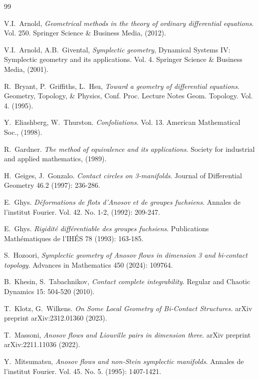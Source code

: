 \documentclass[10pt]{amsart}
\theoremstyle{definition}
\begin{document}
\begin{thebibliography}{99}


 V.I.~Arnold, \textit{Geometrical methods in the theory of ordinary differential equations}. Vol. 250. Springer Science \& Business Media, (2012).

 V.I.~Arnold, A.B.~Givental, {\em Symplectic geometry}, Dynamical Systems IV: Symplectic geometry and its applications. Vol. 4. Springer Science \& Business Media, (2001).


 R.~Bryant, P.~Griffiths, L.~Hsu, \textit{Toward a geometry of differential equations}. Geometry, Topology, \& Physics, Conf. Proc. Lecture Notes Geom. Topology. Vol. 4. (1995).



 Y.~Eliashberg, W.~Thurston. {\em Confoliations}. Vol. 13. American Mathematical Soc., (1998).

 R.~Gardner. {\em The method of equivalence and its applications}. Society for industrial and applied mathematics, (1989).

 H.~Geiges, J.~Gonzalo. {\em Contact circles on 3-manifolds}. Journal of Differential Geometry 46.2 (1997): 236-286.

 E.~Ghys. {\em D\'eformations de flots d'Anosov et de groupes fuchsiens}. Annales de l'institut Fourier. Vol. 42. No. 1-2, (1992): 209-247.

 E.~Ghys. {\em Rigidit\'e diff\'erentiable des groupes fuchsiens}. Publications Math\'ematiques de l'IHÉS 78 (1993): 163-185.

 S.~Hozoori, {\em Symplectic geometry of Anosov flows in dimension 3 and bi-contact topology}. Advances in Mathematics 450 (2024): 109764. %

 B.~Khesin, S.~Tabachnikov, {\em Contact complete integrability}. Regular and Chaotic Dynamics 15: 504-520 (2010).

 T.~Klotz, G.~Wilkens. {\em On Some Local Geometry of Bi-Contact Structures.} arXiv preprint arXiv:2312.01360 (2023).


 T.~Massoni, {\em Anosov flows and Liouville pairs in dimension three}. arXiv preprint arXiv:2211.11036 (2022).


 Y.~Mitsumatsu, {\em Anosov flows and non-Stein symplectic manifolds}. Annales de l'institut Fourier. Vol. 45. No. 5. (1995): 1407-1421.


\end{thebibliography}
\end{document}
